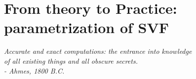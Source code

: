 \chapter{From theory to Practice: parametrization of SVF}\label{ch:to_practice}


\begin{flushright}
	\emph{Accurate and exact computations: the entrance into knowledge \\ of all existing things  and all obscure secrets.\\
		- Ahmes, 1800 B.C.}
\end{flushright}

\vspace{0.6cm}
